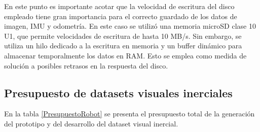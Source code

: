En este punto es importante acotar que la velocidad de escritura del disco empleado tiene gran importancia para el correcto guardado de los datos de imagen, IMU y odometría. En este caso se utilizó una memoria microSD clase 10  U1, que permite velocidades de escritura de hasta 10 MB/s. Sin embargo, se utiliza un hilo dedicado a la escritura en memoria y un buffer dinámico para almacenar temporalmente los datos  en RAM. Esto se emplea como medida de solución a posibles retrasos en la respuesta del disco.


\subsection{Presupuesto de datasets visuales inerciales}

En la tabla \ref{PresupuestoRobot} se presenta el presupuesto total de la generación del prototipo y del desarrollo del dataset visual inercial.


